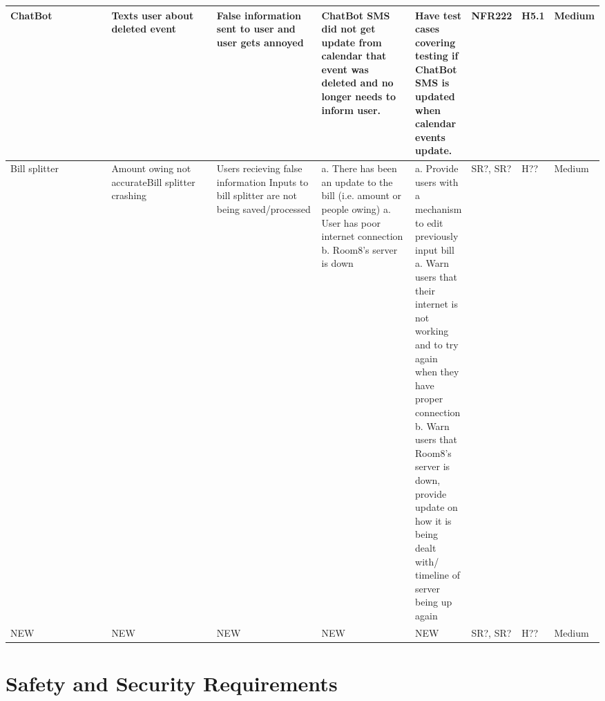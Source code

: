 \documentclass{article}
\begin{document}
\begin{table}[H]
\begin{adjustbox}{width=\textwidth}
\begin{tabular}{|p{0.25\linewidth} | p{0.25\linewidth} | p{0.22\linewidth}|  p{0.22\linewidth}|  p{0.30\linewidth}|  p{0.085\linewidth}|  p{0.05\linewidth}|p{0.12\linewidth}| }
         \hline
         ChatBot & Texts user about deleted event\newline & False information sent to user and user gets annoyed& ChatBot SMS did not get update from calendar that event was deleted and no longer needs to inform user.& Have test cases covering testing if ChatBot SMS is updated when calendar events update.& NFR222 & H5.1 & Medium\\
         \hline
         Bill splitter & Amount owing not accurate\newline\newline\newline\newline Bill splitter crashing \ & Users recieving false information \newline\newline\newline\newline Inputs to bill splitter are not being saved/processed & a. There has been an update to the bill (i.e. amount or people owing) \newline\newline a. User has poor internet connection \newline b. Room8's server is down  & a. Provide users with a mechanism to edit previously input bill \newline\newline\newline a. Warn users that their internet is not working and to try again when they have proper connection \newline b. Warn users that Room8's server is down, provide update on how it is being dealt with/ timeline of server being up again & SR?, SR? & H?? & Medium\\
         \hline
         NEW & NEW\newline & NEW & NEW & NEW & SR?, SR? & H?? & Medium\\
         \hline
    \end{tabular}
    \end{adjustbox}
    \label{tab:my_label}
\end{table}


\newpage

\section{Safety and Security Requirements}

\end{document}
